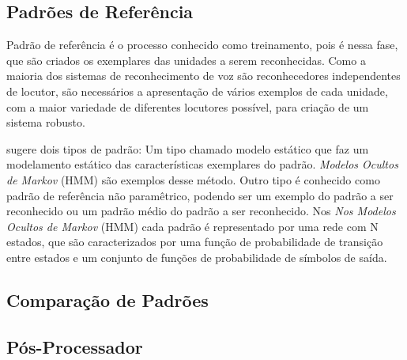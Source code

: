 \subsection{Padrões de Referência}
Padrão de referência é o processo conhecido como treinamento, pois é nessa fase, que são criados os exemplares das unidades a serem reconhecidas. Como a maioria dos sistemas de reconhecimento de voz são reconhecedores independentes de locutor, são necessários a apresentação de vários exemplos de cada unidade, com a maior variedade de diferentes locutores possível, para criação de um sistema robusto. \cite{AvaliaTecJose}

\cite{DigSpeechNejat} sugere dois tipos de padrão: Um tipo chamado modelo estático que faz um modelamento estático das características exemplares do padrão. \textit{Modelos Ocultos de Markov} (HMM) \cite{FundamentRabiner} são exemplos desse método. Outro tipo é conhecido como padrão de referência não paramêtrico, podendo ser um exemplo do padrão a ser reconhecido ou um padrão médio do padrão a ser reconhecido. \cite{AvaliaTecJose}
Nos \textit{Nos Modelos Ocultos de Markov} (HMM) cada padrão é representado por uma rede com N estados, que são caracterizados por uma função de probabilidade de transição entre estados e um conjunto de funções de probabilidade de símbolos de saída. \cite{AvaliaTecJose}


\subsection{Comparação de Padrões}



\subsection{Pós-Processador}
